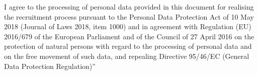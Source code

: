 
    \footer
    {I agree to the processing of personal data provided in this document for realising the recruitment process pursuant to the Personal Data Protection Act of 10 May 2018 (Journal of Laws 2018, item 1000) and in agreement with Regulation (EU) 2016/679 of the European Parliament and of the Council of 27 April 2016 on the protection of natural persons with regard to the processing of personal data and on the free movement of such data, and repealing Directive 95/46/EC (General Data Protection Regulation)”
    }%

    \vspace{\footerheight} %
